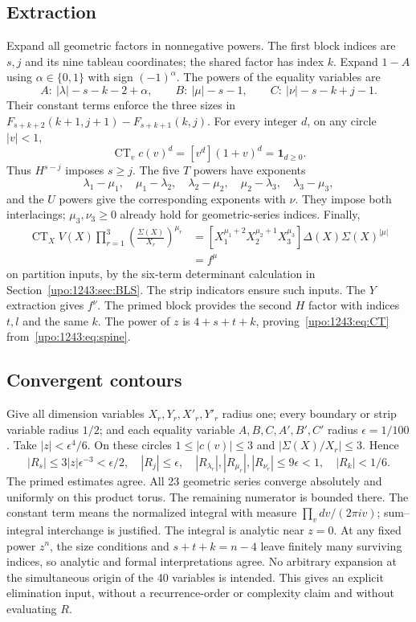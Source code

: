 \documentclass[11pt,letterpaper]{article}
\theoremstyle{remark}\newtheorem{remark}[theorem]{Remark}
\numberwithin{equation}{section}
\begin{document}
\subsection*{Extraction}
Expand all geometric factors in nonnegative powers. The first block
indices are $s,j$ and its nine tableau coordinates; the shared factor
has index $k$. Expand $1-A$ using $\alpha\in\{0,1\}$ with sign
$(-1)^\alpha$. The powers of the equality variables are
\[
 A:\ |\lambda|-s-k-2+\alpha,\qquad
 B:\ |\mu|-s-1,\qquad
 C:\ |\nu|-s-k+j-1.
\]
Their constant terms enforce the three sizes in
$F_{s+k+2}(k+1,j+1)-F_{s+k+1}(k,j)$.
For every integer $d$, on any circle $|v|<1$,
\[
 \operatorname{CT}_v c(v)^d=[v^d](1+v)^d=\mathbf1_{d\ge0}.
\]
Thus $H^{s-j}$ imposes $s\ge j$. The five $T$ powers have exponents
\[
 \lambda_1-\mu_1,\quad\mu_1-\lambda_2,\quad
 \lambda_2-\mu_2,\quad\mu_2-\lambda_3,\quad\lambda_3-\mu_3,
\]
and the $U$ powers give the corresponding exponents with $\nu$.
They impose both interlacings; $\mu_3,\nu_3\ge0$ already hold for
geometric-series indices. Finally,
\begin{align*}
 \operatorname{CT}_X V(X)\prod_{r=1}^3
       \left(\frac{\Sigma(X)}{X_r}\right)^{\mu_r}
 &= [X_1^{\mu_1+2}X_2^{\mu_2+1}X_3^{\mu_3}]
      \Delta(X)\Sigma(X)^{|\mu|}\\
 &=f^\mu
\end{align*}
on partition inputs, by the six-term determinant calculation in
Section~\ref{upo:1243:sec:BLS}. The strip indicators ensure such inputs.
The $Y$ extraction gives $f^\nu$. The primed block provides the second
$H$ factor with indices $t,l$ and the same $k$. The power of $z$ is
$4+s+t+k$, proving~\eqref{upo:1243:eq:CT} from~\eqref{upo:1243:eq:spine}.

\subsection*{Convergent contours}
Give all dimension variables $X_r,Y_r,X'_r,Y'_r$ radius one; every
boundary or strip variable radius $1/2$; and each equality variable
$A,B,C,A',B',C'$ radius $\epsilon=1/100$. Take $|z|<\epsilon^4/6$.
On these circles $1\le|c(v)|\le3$ and $|\Sigma(X)/X_r|\le3$. Hence
\[
 |R_s|\le3|z|\epsilon^{-3}<\epsilon/2,\quad
 |R_j|\le\epsilon,\quad
 |R_{\lambda_r}|,|R_{\mu_r}|,|R_{\nu_r}|\le9\epsilon<1,
 \quad |R_k|<1/6.
\]
The primed estimates agree. All 23 geometric series converge absolutely
and uniformly on this product torus. The remaining numerator is bounded
there. The constant term means the normalized integral with measure
$\prod_v dv/(2\pi iv)$; sum--integral interchange is justified.
The integral is analytic near $z=0$. At any fixed power $z^n$, the size
conditions and $s+t+k=n-4$ leave finitely many surviving indices, so
analytic and formal interpretations agree. No arbitrary expansion at the
simultaneous origin of the 40 variables is intended. This gives an
explicit elimination input, without a recurrence-order or complexity
claim and without evaluating $R$.
\end{document}
